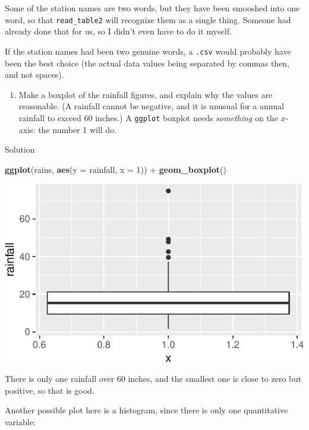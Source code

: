 \documentclass[]{tufte-book}
\newenvironment{Shaded}{}{}
\newcommand{\DataTypeTok}[1]{\textcolor[rgb]{0.56,0.13,0.00}{#1}}
\newcommand{\DecValTok}[1]{\textcolor[rgb]{0.25,0.63,0.44}{#1}}
\newcommand{\KeywordTok}[1]{\textcolor[rgb]{0.00,0.44,0.13}{\textbf{#1}}}
\newcommand{\NormalTok}[1]{#1}
\newcommand{\OperatorTok}[1]{\textcolor[rgb]{0.40,0.40,0.40}{#1}}
\newcommand{\StringTok}[1]{\textcolor[rgb]{0.25,0.44,0.63}{#1}}
\providecommand{\tightlist}{%
  \setlength{\itemsep}{0pt}\setlength{\parskip}{0pt}}
\theoremstyle{definition}
\theoremstyle{definition}
\theoremstyle{definition}
\theoremstyle{remark}
\begin{document}
Some of the station names are two words, but they have been smooshed
into one word, so that \texttt{read\_table2} will recognize them as a
single thing. Someone had already done that for us, so I didn't even
have to do it myself.

If the station names had been two genuine words, a \texttt{.csv} would
probably have been the best choice (the actual data values being
separated by commas then, and not spaces).

\begin{enumerate}
\def\labelenumi{(\alph{enumi})}
\setcounter{enumi}{1}
\tightlist
\item
  Make a boxplot of the rainfall figures, and explain why the values are
  reasonable. (A rainfall cannot be negative, and it is unusual for a
  annual rainfall to exceed 60 inches.) A \texttt{ggplot} boxplot needs
  \emph{something} on the \(x\)-axis: the number 1 will do.
\end{enumerate}

Solution

\begin{Shaded}
\begin{Highlighting}[]
\KeywordTok{ggplot}\NormalTok{(rains, }\KeywordTok{aes}\NormalTok{(}\DataTypeTok{y =}\NormalTok{ rainfall, }\DataTypeTok{x =} \DecValTok{1}\NormalTok{)) }\OperatorTok{+}\StringTok{ }\KeywordTok{geom_boxplot}\NormalTok{()}
\end{Highlighting}
\end{Shaded}

\includegraphics{12-regression_files/figure-latex/unnamed-chunk-4-1}

There is only one rainfall over 60 inches, and the smallest one is close
to zero but positive, so that is good.

Another possible plot here is a histogram, since there is only one
quantitative variable:
\end{document}
